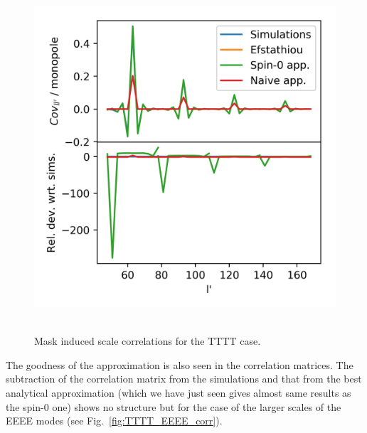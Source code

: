 \documentclass[useAMS,usenatbib]{mn2e}
\begin{document}
\begin{figure} %
  \centering
  \includegraphics[width=\columnwidth]{./figures/run_sph_ALL_TTTT_rows_cov_matrix.png}~
  \caption{Mask induced scale correlations for the TTTT case.}
  \label{fig:TTTT_rows}
\end{figure}

The goodness of the approximation is also seen in the correlation matrices.
The subtraction of the correlation matrix from the simulations and that from
the best analytical approximation (which we have just seen gives almost same
results as the spin-0 one) shows no structure but for the case of the larger
scales of the EEEE modes (see Fig.~\ref{fig:TTTT_EEEE_corr}).
\end{document}
